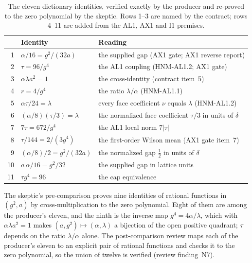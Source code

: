 \begin{table}[htbp]
\centering\small
\caption{The eleven dictionary identities, verified exactly by the producer and
re-proved to the zero polynomial by the skeptic. Rows 1--3 are named by the
contract; rows 4--11 are added from the AL1, AX1 and I1 premises.}
\label{tab:az1-identities}
\begin{tabular}{@{}rll@{}}
\toprule
& Identity & Reading\\
\midrule
1 & $\alpha/16=g^2/(32a)$ & the supplied gap (AX1 gate; AX1 reverse report)\\
2 & $\tau=96/g^4$ & the AL1 coupling (HNM-AL1.2; AX1 gate)\\
3 & $\alpha\lambda a^2=1$ & the cross-identity (contract item~5)\\
4 & $r=4/g^4$ & the ratio $\lambda/\alpha$ (HNM-AL1.1)\\
5 & $\alpha\tau/24=\lambda$ & every face coefficient $\nu$ equals $\lambda$ (HNM-AL1.2)\\
6 & $(\alpha/8)(\tau/3)=\lambda$ & the normalized face coefficient $\tau/3$ in units of $\delta$\\
7 & $7\tau=672/g^4$ & the AL1 local norm $7|\tau|$\\
8 & $\tau/144=2/(3g^4)$ & the first-order Wilson mean (AX1 gate item~7)\\
9 & $(\alpha/8)/2=g^2/(32a)$ & the normalized gap $\tfrac12$ in units of $\delta$\\
10 & $a\,\alpha/16=g^2/32$ & the supplied gap in lattice units\\
11 & $\tau g^4=96$ & the cap equivalence\\
\bottomrule
\end{tabular}
\end{table}

The skeptic's pre-comparison proves nine identities of rational functions in
$(g^2,a)$ by cross-multiplication to the zero polynomial. Eight of them are
among the producer's eleven, and the ninth is the inverse map
$g^4=4\alpha/\lambda$, which with $\alpha\lambda a^2=1$ makes
$(a,g^2)\mapsto(\alpha,\lambda)$ a bijection of the open positive quadrant;
$\tau$ depends on the ratio $\lambda/\alpha$ alone. The post-comparison
review maps each of the producer's eleven to an explicit pair of rational
functions and checks it to the zero polynomial, so the union of twelve is
verified (review finding~N7).

